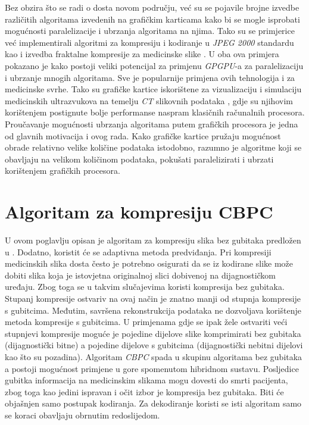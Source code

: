 \documentclass[times, utf8, zavrsni, numeric, sort]{fer}
\begin{document}
Bez obzira što se radi o dosta novom području, već su se pojavile brojne izvedbe različitih algoritama izvedenih na grafičkim karticama kako bi se mogle isprobati mogućnosti paralelizacije i ubrzanja algoritama na njima. Tako su se primjerice već implementirali algoritmi za kompresiju i kodiranje u \emph{JPEG 2000} standardu \cite{jpeg2} kao i izvedba fraktalne kompresije za medicinske slike \cite{fractal}. U oba ova primjera pokazano je kako postoji veliki potencijal za primjenu \emph{GPGPU}-a za paralelizaciju i ubrzanje mnogih algoritama. Sve je popularnije primjena ovih tehnologija i za medicinske svrhe. Tako su grafičke kartice iskorištene za vizualizaciju i simulaciju medicinskih ultrazvukova na temelju \emph{CT} slikovnih podataka \cite{ctviz}, gdje su njihovim korištenjem postignute bolje performanse naspram klasičnih računalnih procesora. Proučavanje mogućnosti ubrzanja algoritama putem grafičkih procesora je jedna od glavnih motivacija i ovog rada. Kako grafičke kartice pružaju mogućnost obrade relativno velike količine podataka istodobno, razumno je algoritme koji se obavljaju na velikom količinom podataka, pokušati paralelizirati i ubrzati korištenjem grafičkih procesora.


\chapter{Algoritam za kompresiju CBPC}

U ovom poglavlju opisan je algoritam za kompresiju slika bez gubitaka predložen u \cite{Knezovic:06, Knezovic:07}. Dodatno, koristit će se adaptivna metoda predviđanja. Pri kompresiji medicinskih slika dosta često je potrebno osigurati da se iz kodirane slike može dobiti slika koja je istovjetna originalnoj slici dobivenoj na dijagnostičkom uređaju. Zbog toga se u takvim slučajevima koristi kompresija bez gubitaka. Stupanj kompresije ostvariv na ovaj način je znatno manji od stupnja kompresije s gubitcima. Međutim, savršena rekonstrukcija podataka ne dozvoljava korištenje metoda kompresije s gubitcima. U primjenama gdje se ipak žele ostvariti veći stupnjevi kompresije moguće je pojedine dijelove slike komprimirati bez gubitaka (dijagnostički bitne) a pojedine dijelove s gubitcima (dijagnostički nebitni dijelovi kao što su pozadina). Algoritam \emph{CBPC} spada u skupinu algoritama bez gubitaka a postoji mogućnost primjene u gore spomenutom hibridnom sustavu. Posljedice gubitka informacija na medicinskim slikama mogu dovesti do smrti pacijenta, zbog toga kao jedini ispravan i očit izbor je kompresija bez gubitaka. Biti će objašnjen samo postupak kodiranja. Za dekodiranje koristi se isti algoritam samo se koraci obavljaju obrnutim redoslijedom.
\end{document}
